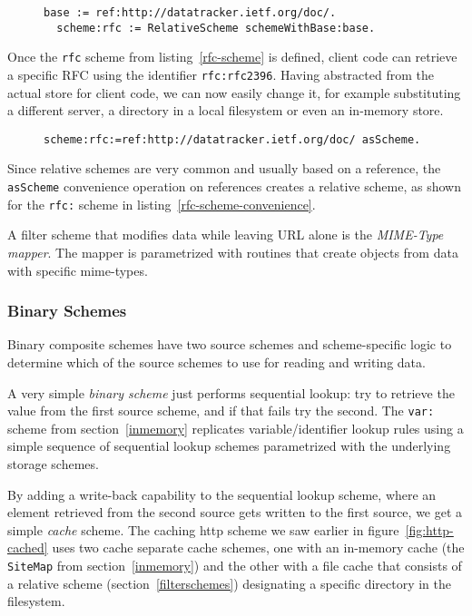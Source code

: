 \documentclass[preprint,authoryear]{acm_proc_article-sp}
\begin{document}
\begin{figure}[htbp]
\begin{lstlisting}[style=L,label=rfc-scheme,caption=Defining a custom rfc: scheme.]
  base := ref:http://datatracker.ietf.org/doc/.
  scheme:rfc := RelativeScheme schemeWithBase:base.
\end{lstlisting}
\end{figure}

Once the {\tt rfc} scheme from listing~\ref{rfc-scheme} is defined, client code can 
retrieve a specific RFC using the identifier {\tt  rfc:rfc2396}.  Having abstracted
from the actual store for client code, we can now easily change it, for example
substituting a different server, a directory in a local filesystem or even an 
in-memory store.


\begin{figure}[htbp]
\begin{lstlisting}[style=L,label=rfc-scheme-convenience,caption=Defining a custom rfc: scheme.]
scheme:rfc:=ref:http://datatracker.ietf.org/doc/ asScheme.
\end{lstlisting}
\end{figure}

Since relative schemes are very common and usually based on a reference, the
{\tt asScheme} convenience operation on references creates a relative scheme, as shown
for the {\tt rfc:} scheme in listing~\ref{rfc-scheme-convenience}.

A filter scheme that modifies data while leaving URL alone is the {\em MIME-Type mapper}.
The mapper is parametrized with routines that create objects from data with specific
mime-types.  


\subsubsection{Binary Schemes}

Binary composite schemes have two source schemes and scheme-specific logic
to determine which of the source schemes to use for reading and writing data.

A very simple {\em binary scheme} just performs sequential lookup:  try to
retrieve the value from the first source scheme, and if that fails try the second.
The {\tt var:} scheme from section~\ref{inmemory}  replicates variable/identifier
lookup rules using a simple sequence of sequential lookup schemes parametrized
with the underlying storage schemes.

By adding a write-back capability to the sequential lookup scheme, where an element
retrieved from the second source gets written to the first source, we get a simple {\em cache} scheme.  
The caching http scheme we saw earlier in figure~\ref{fig:http-cached} uses two cache
separate cache schemes, one with an in-memory cache (the {\tt SiteMap} from section~\ref{inmemory})
and the other with a file cache that consists of a relative scheme (section~\ref{filterschemes}) 
designating a specific directory in the filesystem.
\end{document}
